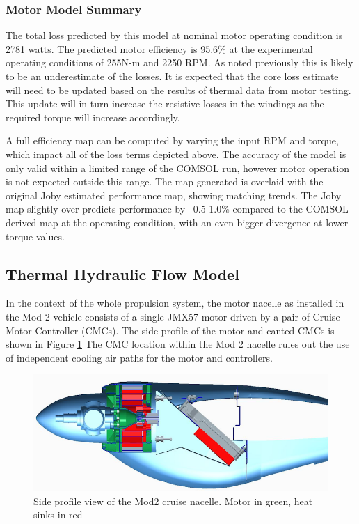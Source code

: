 \documentclass[]{aiaa-tc}%
\begin{document}
\subsubsection{Motor Model Summary}
The total loss predicted by this model at nominal motor operating condition is 2781 watts. The predicted motor efficiency is 95.6\% at the experimental operating conditions of 255N-m and 2250 RPM. As noted previously this is likely to be an underestimate of the losses. It is expected that the core loss estimate will need to be updated based on the results of thermal data from motor testing. This update will in turn increase the resistive losses in the windings as the required torque will increase accordingly.

A full efficiency map can be computed by varying the input RPM and torque, which impact all of the loss terms depicted above. The accuracy of the model is only valid within a limited range of the COMSOL run, however motor operation is not expected outside this range. The map generated is overlaid with the original Joby estimated performance map, showing matching trends. The Joby map slightly over predicts performance by ~0.5-1.0\% compared to the COMSOL derived map at the operating condition, with an even bigger divergence at lower torque values.

\subsection{Thermal Hydraulic Flow Model}

In the context of the whole propulsion system, the motor nacelle as installed in the Mod 2 vehicle consists of a single JMX57 motor driven by a pair of Cruise Motor Controller (CMCs). The side-profile of the motor and canted CMCs is shown in Figure \ref{fig:Mod2Profile} The CMC location within the Mod 2 nacelle rules out the use of independent cooling air paths for the motor and controllers.  

\begin{figure}[!h]%
	\centering
	\includegraphics[width=1.0\textwidth]{figures/mod2_profile.png}
	\caption{Side profile view of the Mod2 cruise nacelle. Motor in green, heat sinks in red}
	\label{fig:Mod2Profile}
\end{figure}
\end{document}
